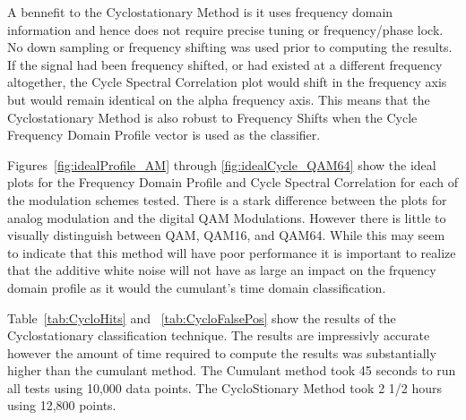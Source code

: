 A bennefit to the Cyclostationary Method is it uses frequency domain information
and hence does not require precise tuning or frequency/phase lock.  No down
sampling or frequency shifting was used prior to computing the results.  If the
signal had been frequency shifted, or had existed at a different frequency
altogether, the Cycle Spectral Correlation plot would shift in the frequency
axis but would remain identical on the alpha frequency axis.  This means that
the Cyclostationary Method is also robust to Frequency Shifts when the Cycle
Frequency Domain Profile vector is used as the classifier.

Figures~\ref{fig:idealProfile_AM} through \ref{fig:idealCycle_QAM64} show the
ideal plots for the Frequency Domain Profile and Cycle Spectral Correlation for
each of the modulation schemes tested.  There is a stark difference between the
plots for analog modulation and the digital QAM Modulations.  However there is 
little to visually distinguish between QAM, QAM16, and QAM64.  While this may
seem to indicate that this method will have poor performance it is important to
realize that the additive white noise will not have as large an impact on the
frquency domain profile as it would the cumulant's time domain classification.

Table~\ref{tab:CycloHits} and ~\ref{tab:CycloFalsePos} show the results of the
Cyclostationary classification technique.  The results are impressivly accurate
however the amount of time required to compute the results was substantially higher than the
cumulant method.  The Cumulant method took 45 seconds to run all tests using
10,000 data points.  The CycloStionary Method took 2 1/2 hours using 12,800
points.

